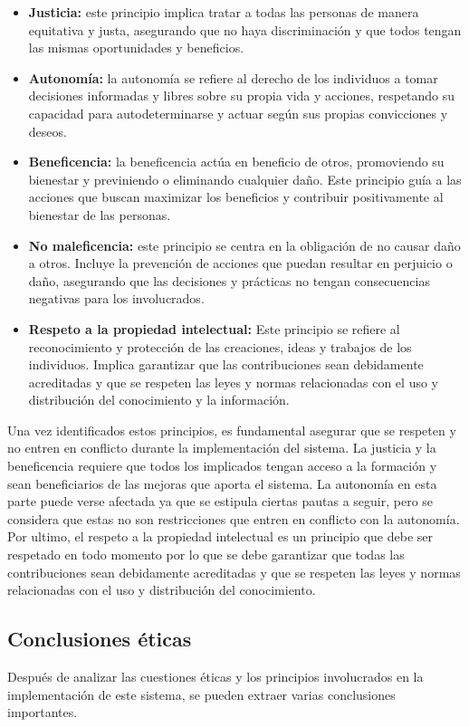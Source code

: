 \begin{itemize}
    \item \textbf{Justicia:} este principio implica tratar a todas las personas 
    de manera equitativa y justa, asegurando que no haya discriminación 
    y que todos tengan las mismas oportunidades y beneficios.
    \item \textbf{Autonomía:} la autonomía se refiere al derecho de los individuos 
    a tomar decisiones informadas y libres sobre su propia vida y acciones, 
    respetando su capacidad para autodeterminarse y actuar según sus propias 
    convicciones y deseos.
    \item \textbf{Beneficencia:} la beneficencia actúa en beneficio de otros, 
    promoviendo su bienestar y previniendo o eliminando cualquier daño. Este 
    principio guía a las acciones que buscan maximizar los beneficios y contribuir 
    positivamente al bienestar de las personas.
    \item \textbf{No maleficencia:} este principio se centra en la obligación de 
    no causar daño a otros. Incluye la prevención de acciones que puedan resultar 
    en perjuicio o daño, asegurando que las decisiones y prácticas no tengan 
    consecuencias negativas para los involucrados.
    \item \textbf{Respeto a la propiedad intelectual:} Este principio se refiere al 
    reconocimiento y protección de las creaciones, ideas y trabajos de los 
    individuos. Implica garantizar que las contribuciones sean debidamente 
    acreditadas y que se respeten las leyes y normas relacionadas con el uso 
    y distribución del conocimiento y la información.
\end{itemize}

Una vez identificados estos principios, es fundamental asegurar que se respeten
y no entren en conflicto durante la implementación del sistema. La justicia y la
beneficencia requiere que todos los implicados tengan acceso a la formación y
sean beneficiarios de las mejoras que aporta el sistema. La autonomía en esta parte
puede verse afectada ya que se estipula ciertas pautas a seguir, pero se considera
que estas no son restricciones que entren en conflicto con la autonomía. Por ultimo,
el respeto a la propiedad intelectual es un principio que debe ser respetado en todo
momento por lo que se debe garantizar que todas las contribuciones sean debidamente
acreditadas y que se respeten las leyes y normas relacionadas con el uso y distribución
del conocimiento.

\subsection{Conclusiones éticas}
Después de analizar las cuestiones éticas y los principios involucrados en la implementación
de este sistema, se pueden extraer varias conclusiones importantes. 

\pagebreak